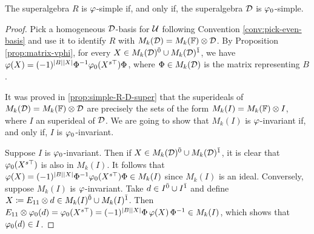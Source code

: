 \begin{prop}\label{prop:vphi-R-simple-D-simple}
	The superalgebra $R$ is $\varphi$-simple if, and only if, the superalgebra $\mathcal{D}$ is $\varphi_0$-simple. 
\end{prop}

\begin{proof}
	Pick a homogeneous $\mathcal{D}$-basis for $\mathcal U$ following Convention \ref{conv:pick-even-basis} and use it to identify $R$ with $M_k(\mathcal{D}) = M_k(\mathbb{F}) \otimes \mathcal{D}$.
	By Proposition \ref{prop:matrix-vphi}, for every $X \in M_k(\mathcal{D})^{\bar0} \cup M_k(\mathcal{D})^{\bar1}$, we have
	$\varphi(X) = (-1)^{|B||X|}\Phi^{-1} \varphi_0(X^{s\top}) \Phi$, where $\Phi \in M_k(\mathcal{D})$ is the matrix representing $B$. 

    It was proved in \cref{prop:simple-R-D-super} that the superideals of $M_k(\mathcal{D}) = M_k(\mathbb{F}) \otimes \mathcal{D}$ are precisely the sets of the form $M_k(I) = M_k(\mathbb{F}) \otimes I$, where $I$ an superideal of $\mathcal{D}$. 
    We are going to show that $M_k(I)$ is $\varphi$-invariant if, and only if, $I$ is $\varphi_0$-invariant. 
    
	Suppose $I$ is $\varphi_0$-invariant.
	Then if $X \in M_k(\mathcal{D})^{\bar0} \cup M_k(\mathcal{D})^{\bar1}$, it is clear that $\varphi_0 (X^{s\top})$ is also in $M_k(I)$.
	It follows that $\varphi(X) = (-1)^{|B||X|} \Phi^{-1} \varphi_0(X^{s\top}) \Phi \in M_k(I)$ since $M_k(I)$ is an ideal.
	Conversely, suppose $M_k(I)$ is $\varphi$-invariant.
	Take $d \in I^{\bar0} \cup I^{\bar1}$ and define $X \coloneqq E_{11} \otimes d \in M_k(I)^{\bar0} \cup M_k(I)^{\bar1}$.
	Then $E_{11} \otimes \varphi_0(d) = \varphi_0(X^{s\top}) = (-1)^{|B||X|} \Phi\, \varphi(X)\, \Phi^{-1} \in M_k(I)$, which shows that $\varphi_0(d) \in I$.
\end{proof}